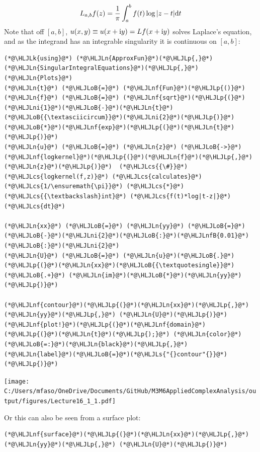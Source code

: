 \documentclass[12pt,landscape]{article}
\newcommand{\HLJLk}[1]{\textcolor[RGB]{148,91,176}{\textbf{#1}}}
\newcommand{\HLJLn}[1]{#1}
\newcommand{\HLJLnf}[1]{\textcolor[RGB]{66,102,213}{#1}}
\newcommand{\HLJLs}[1]{\textcolor[RGB]{201,61,57}{#1}}
\newcommand{\HLJLnfB}[1]{\textcolor[RGB]{59,151,46}{#1}}
\newcommand{\HLJLni}[1]{\textcolor[RGB]{59,151,46}{#1}}
\newcommand{\HLJLoB}[1]{\textcolor[RGB]{102,102,102}{\textbf{#1}}}
\newcommand{\HLJLp}[1]{#1}
\newcommand{\HLJLcs}[1]{\textcolor[RGB]{153,153,119}{\textit{#1}}}
\def\D{ {\rm d} }
\def\I{ {\rm i} }
\def\dt{\D t}
\begin{document}
{\[
L_{a,b} f(z) = {1 \over \pi }\int_a^b f(t) \log | z - t| \dt
\]
Note that off $[a,b]$, $u(x,y) \equiv u(x+\I y) = L f(x+\I y)$ solves Laplace's equation, and as the integrand has an integrable singularity it is continuous on $[a,b]$:


\begin{lstlisting}
(*@\HLJLk{using}@*) (*@\HLJLn{ApproxFun}@*)(*@\HLJLp{,}@*) (*@\HLJLn{SingularIntegralEquations}@*)(*@\HLJLp{,}@*) (*@\HLJLn{Plots}@*)
(*@\HLJLn{t}@*) (*@\HLJLoB{=}@*) (*@\HLJLnf{Fun}@*)(*@\HLJLp{()}@*)
(*@\HLJLn{f}@*) (*@\HLJLoB{=}@*) (*@\HLJLnf{sqrt}@*)(*@\HLJLp{(}@*)(*@\HLJLni{1}@*)(*@\HLJLoB{-}@*)(*@\HLJLn{t}@*)(*@\HLJLoB{{\textasciicircum}}@*)(*@\HLJLni{2}@*)(*@\HLJLp{)}@*)(*@\HLJLoB{*}@*)(*@\HLJLnf{exp}@*)(*@\HLJLp{(}@*)(*@\HLJLn{t}@*)(*@\HLJLp{)}@*)
(*@\HLJLn{u}@*) (*@\HLJLoB{=}@*) (*@\HLJLn{z}@*) (*@\HLJLoB{->}@*) (*@\HLJLnf{logkernel}@*)(*@\HLJLp{(}@*)(*@\HLJLn{f}@*)(*@\HLJLp{,}@*) (*@\HLJLn{z}@*)(*@\HLJLp{)}@*)  (*@\HLJLcs{{\#}}@*) (*@\HLJLcs{logkernel(f,z)}@*) (*@\HLJLcs{calculates}@*) (*@\HLJLcs{1/\ensuremath{\pi}}@*) (*@\HLJLcs{*}@*) (*@\HLJLcs{{\textbackslash}int}@*) (*@\HLJLcs{f(t)*log|t-z|}@*) (*@\HLJLcs{dt}@*)

(*@\HLJLn{xx}@*) (*@\HLJLoB{=}@*) (*@\HLJLn{yy}@*) (*@\HLJLoB{=}@*) (*@\HLJLoB{-}@*)(*@\HLJLni{2}@*)(*@\HLJLoB{:}@*)(*@\HLJLnfB{0.01}@*)(*@\HLJLoB{:}@*)(*@\HLJLni{2}@*)
(*@\HLJLn{U}@*) (*@\HLJLoB{=}@*) (*@\HLJLn{u}@*)(*@\HLJLoB{.}@*)(*@\HLJLp{(}@*)(*@\HLJLn{xx}@*)(*@\HLJLoB{{\textquotesingle}}@*) (*@\HLJLoB{.+}@*) (*@\HLJLn{im}@*)(*@\HLJLoB{*}@*)(*@\HLJLn{yy}@*)(*@\HLJLp{)}@*)

(*@\HLJLnf{contour}@*)(*@\HLJLp{(}@*)(*@\HLJLn{xx}@*)(*@\HLJLp{,}@*) (*@\HLJLn{yy}@*)(*@\HLJLp{,}@*) (*@\HLJLn{U}@*)(*@\HLJLp{)}@*)
(*@\HLJLnf{plot!}@*)(*@\HLJLp{(}@*)(*@\HLJLnf{domain}@*)(*@\HLJLp{(}@*)(*@\HLJLn{t}@*)(*@\HLJLp{);}@*) (*@\HLJLn{color}@*)(*@\HLJLoB{=:}@*)(*@\HLJLn{black}@*)(*@\HLJLp{,}@*) (*@\HLJLn{label}@*)(*@\HLJLoB{=}@*)(*@\HLJLs{"{}contour"{}}@*)(*@\HLJLp{)}@*)
\end{lstlisting}

\texttt{[image: C:/Users/mfaso/OneDrive/Documents/GitHub/M3M6AppliedComplexAnalysis/output/figures/Lecture16\_1\_1.pdf]}

Or this can also be seen from a surface plot:


\begin{lstlisting}
(*@\HLJLnf{surface}@*)(*@\HLJLp{(}@*)(*@\HLJLn{xx}@*)(*@\HLJLp{,}@*) (*@\HLJLn{yy}@*)(*@\HLJLp{,}@*) (*@\HLJLn{U}@*)(*@\HLJLp{)}@*)
\end{lstlisting}

}
\end{document}
